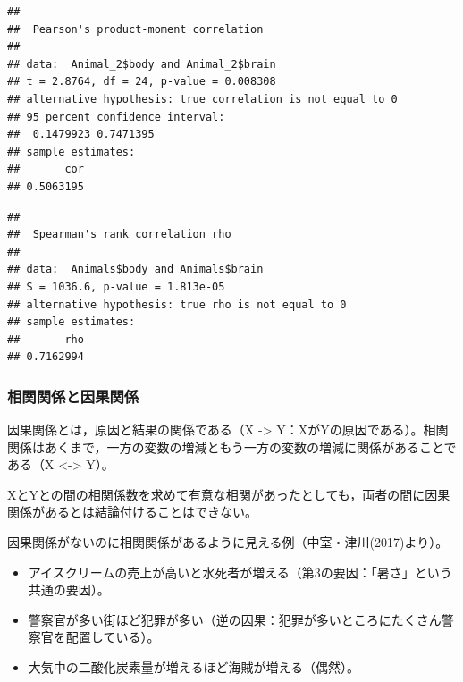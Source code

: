 \documentclass[]{article}
\newenvironment{Shaded}{\begin{snugshade}}{\end{snugshade}}
\newcommand{\KeywordTok}[1]{\textcolor[rgb]{0.13,0.29,0.53}{\textbf{#1}}}
\newcommand{\DataTypeTok}[1]{\textcolor[rgb]{0.13,0.29,0.53}{#1}}
\newcommand{\DecValTok}[1]{\textcolor[rgb]{0.00,0.00,0.81}{#1}}
\newcommand{\StringTok}[1]{\textcolor[rgb]{0.31,0.60,0.02}{#1}}
\newcommand{\CommentTok}[1]{\textcolor[rgb]{0.56,0.35,0.01}{\textit{#1}}}
\newcommand{\OperatorTok}[1]{\textcolor[rgb]{0.81,0.36,0.00}{\textbf{#1}}}
\newcommand{\NormalTok}[1]{#1}
\providecommand{\tightlist}{%
  \setlength{\itemsep}{0pt}\setlength{\parskip}{0pt}}
\begin{document}
\begin{Shaded}
\end{Shaded}

\begin{verbatim}
## 
##  Pearson's product-moment correlation
## 
## data:  Animal_2$body and Animal_2$brain
## t = 2.8764, df = 24, p-value = 0.008308
## alternative hypothesis: true correlation is not equal to 0
## 95 percent confidence interval:
##  0.1479923 0.7471395
## sample estimates:
##       cor 
## 0.5063195
\end{verbatim}

\begin{Shaded}
\end{Shaded}

\begin{verbatim}
## 
##  Spearman's rank correlation rho
## 
## data:  Animals$body and Animals$brain
## S = 1036.6, p-value = 1.813e-05
## alternative hypothesis: true rho is not equal to 0
## sample estimates:
##       rho 
## 0.7162994
\end{verbatim}

\subsubsection{相関関係と因果関係}

因果関係とは，原因と結果の関係である（X -\textgreater{}
Y：XがYの原因である）。相関関係はあくまで，一方の変数の増減ともう一方の変数の増減に関係があることである（X
\textless{}-\textgreater{} Y）。

XとYとの間の相関係数を求めて有意な相関があったとしても，両者の間に因果関係があるとは結論付けることはできない。

因果関係がないのに相関関係があるように見える例（中室・津川(2017)より）。

\begin{itemize}
\tightlist
\item
  アイスクリームの売上が高いと水死者が増える（第3の要因：「暑さ」という共通の要因）。\\
\item
  警察官が多い街ほど犯罪が多い（逆の因果：犯罪が多いところにたくさん警察官を配置している）。\\
\item
  大気中の二酸化炭素量が増えるほど海賊が増える（偶然）。
\end{itemize}
\end{document}
